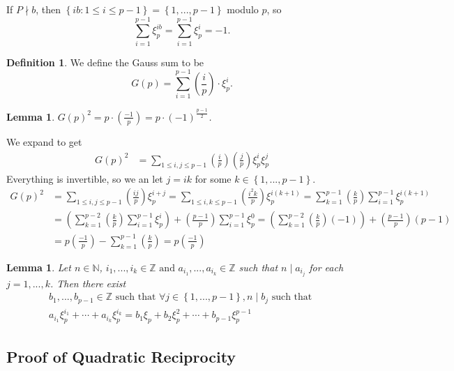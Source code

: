 \documentclass[11pt]{article}
\newtheorem{lemma}[thm]{Lemma}
\theoremstyle{definition}
\newtheorem{defn}{Definition}[section]
\newcommand{\legendre}[2]{\left(\frac{#1}{#2}\right)}
\newcommand{\set}[1]{\left\{ #1 \right\}}
\newcommand{\st}[0]{\text{ such that }}
\newcommand{\et}[0]{\text{ and }}
\newcommand{\ZZ}{\mathbb{Z}}
\newcommand{\NN}{\mathbb{N}}
\begin{document}
	If $P\nmid b$, then $\set{ib : 1 \le i \le p-1} = \set{1, ..., p-1}$ modulo $p$, so
	$$ \sum_{i=1}^{p-1} \xi_p^{ib} = \sum_{i=1}^{p-1} \xi_p^{i} = -1. $$
\qedhere

\begin{defn}
	We define the Gauss sum to be 
	$$ G(p) = \sum_{i=1}^{p-1} \legendre{i}{p} \cdot \xi_p^i . $$
\end{defn}

\begin{lemma}
	$ G(p)^2 = p\cdot\legendre{-1}{p} = p \cdot (-1)^\frac{p-1}{2} $.
\end{lemma}
\proof
	We expand to get
	\begin{align*} 
		G(p)^2 &= \sum_{1\le i,j \le p-1} \legendre{i}{p} \legendre{j}{p} \xi_p^i \xi_p^j
	\end{align*}
	Everything is invertible, so we an let $j = ik$ for some $k\in\set{1,...,p-1}$. 
	\begin{align*}
		G(p)^2 &= \sum_{1\le i,j \le p-1} \legendre{ij}{p} \xi_p^{i+j}
		= \sum_{1\le i,k \le p-1} \legendre{i^2 k}{p} \xi_p^{i(k+1)} 
		= \sum_{k=1}^{p-1} \legendre{k}{p} \sum_{i=1}^{p-1} \xi_p^{i(k+1)} \\
		&= \left( \sum_{k=1}^{p-2} \legendre{k}{p} \sum_{i=1}^{p-1} \xi_p^{i} \right) + \legendre{p-1}{p} \sum_{i=1}^{p-1} \xi_p^{0} 
		= \left( \sum_{k=1}^{p-2} \legendre{k}{p} (-1) \right) + \legendre{p-1}{p} (p-1) \\
		&= p\legendre{-1}{p} - \sum_{k=1}^{p-1} \legendre{k}{p}
		= p\legendre{-1}{p}
	\end{align*}
\qedhere

\begin{lemma}
	Let $n\in\NN$, $i_1, ..., i_k \in\ZZ \et a_{i_1},...,a_{i_k} \in\ZZ$ such that $n\mid a_{i_j}$ for each $j = 1,...,k$. 
	Then there exist 
	\begin{gather*}
		b_1,...,b_{p-1}\in\ZZ \st \forall j\in\set{1,...,p-1}, n\mid b_j \st \\ 
		a_{i_1} \xi_p^{i_1} + \cdots + a_{i_k} \xi_p^{i_k} = b_1\xi_p + b_2\xi_p^2 + \cdots + b_{p-1}\xi_p^{p-1}
	\end{gather*}
\end{lemma}


\subsection{Proof of Quadratic Reciprocity}
\end{document}
